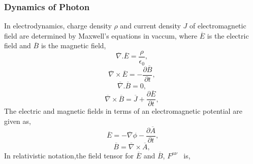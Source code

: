 \subsubsection{Dynamics of Photon}
In electrodynamics, charge density $\rho$ and current density $J$ of electromagnetic field are determined by Maxwell's equations in vaccum, where $\overline{E}$ is the electric field and $\overline{B}$ is the magnetic field,
\begin{equation}
\overline{\nabla}.\overline{E}=\frac{\rho}{\epsilon_{0}},
\end{equation}
\begin{equation}
\overline{\nabla}\times\overline{E}=-\frac{\partial{\overline B}}{\partial{t}},
\end{equation}
\begin{equation}
\overline{\nabla}.\overline{B}=0,
\end{equation}
\begin{equation}
\overline{\nabla}\times\overline{B}=\overline{J}+\frac{\partial\overline{E}}{\partial t},
\end{equation}
The electric and magnetic fields in terms of an electromagnetic potential are given as,
\begin{equation}~\label{E_field}
\overline{E}=-\overline{\nabla}\phi-\frac{\partial{\overline{A}}}{\partial t},
\end{equation}
\begin{equation}\label{B_field}
\overline{B}=\overline{\nabla}\times\overline{A},
\end{equation}
In relativistic notation,the field tensor for $\overline{E}$ and $\overline{B}$, $F^{\mu\nu}$~\cite{Griffith-ed} is,

